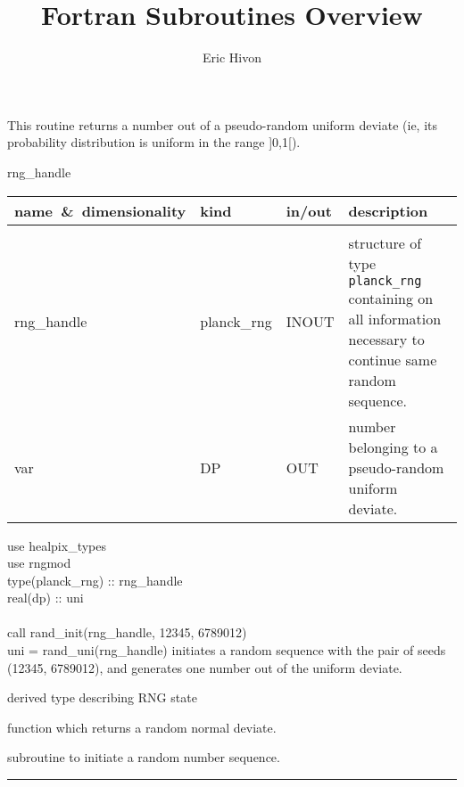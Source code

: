 
\sloppy


\title{\healpix Fortran Subroutines Overview}
 \section[rand\_uni]{ }
\label{sub:rand_uni}
\author{Eric Hivon}

\begin{facility}
{This routine returns a number out of a pseudo-random uniform deviate (ie, its
  probability distribution is uniform in the range ]0,1[).
}
{\modRngmod}
\end{facility}

\begin{f90function}
{rng\_handle}
\end{f90function}

\begin{arguments}
{
\begin{tabular}{p{0.3\hsize} p{0.15\hsize} p{0.1\hsize} p{0.35\hsize}} \hline  
\textbf{name~\&~dimensionality} & \textbf{kind} & \textbf{in/out} & \textbf{description} \\ \hline
                   &   &   &                           \\ %
rng\_handle & planck\_rng & INOUT & structure of type {\tt planck\_rng}
                   containing on all information necessary to continue same
                   random sequence. \\ 
var & DP & OUT & number belonging to a pseudo-random uniform deviate.
\end{tabular}
}
\end{arguments}

\begin{example}
{
use healpix\_types \\
use rngmod \\
type(planck\_rng) :: rng\_handle \\
real(dp) :: uni \\
\\
call rand\_init(rng\_handle, 12345, 6789012)  \\
uni = rand\_uni(rng\_handle)
}
{
initiates a random sequence with the pair of seeds (12345, 6789012), and
generates one number out of the uniform deviate.
}
\end{example}

\begin{related}
  \begin{sulist}{} %
  \item[\htmlref{planck\_rng}{sub:planck_rng}] derived type describing RNG state
  \item[\htmlref{rand\_gauss}{sub:rand_gauss}] function which returns a  random normal deviate.
  \item[\htmlref{rand\_init}{sub:rand_init}] subroutine to initiate a random number sequence. 
  \end{sulist}
\end{related}

\rule{\hsize}{2mm}

\newpage
